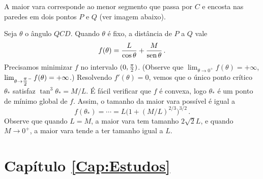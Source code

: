 \begin{Solution}{7.22}
A maior vara corresponde ao menor segmento que passa por $C$ e
encosta nas paredes em dois pontos $P$ e $Q$ (ver imagem
abaixo).
\begin{center}
\begin{bmlimage}\end{bmlimage}
\end{center}
Seja $\theta$ o ângulo $QCD$. Quando $\theta$ é fixo, a
distância de $P$ a $Q$ vale
$$
f(\theta)=\frac{L}{\cos \theta}+\frac{M}{\operatorname{sen} \theta}\,.
$$
Precisamos minimizar $f$ no intervalo $(0,\tfrac{\pi}{2})$.
(Observe que $\lim_{\theta\to 0^+}f(\theta)=+\infty$,
$\lim_{\theta\to {\tfrac{\pi}{2}}^-}f(\theta)=+\infty$.)
Resolvendo $f'(\theta)=0$, vemos que o único ponto crítico
$\theta_*$ satisfaz $\tan^3\theta_*=M/L$. É fácil verificar
que $f$ é convexa, logo $\theta_*$ é um ponto de mínimo global
de $f$.
Assim, o tamanho da maior vara possível é igual a
$$
f(\theta_*)=\cdots=L\bigl(1+(M/L)^{2/3}\bigr)^{3/2}\,.
$$
Observe que quando $L=M$, a maior vara tem tamanho
$2\sqrt{2}L$, e quando $M\to 0^+$, a maior vara tende a ter
tamanho igual a $L$.
\end{Solution}
\protect \section *{Capítulo \ref {Cap:Estudos}}

